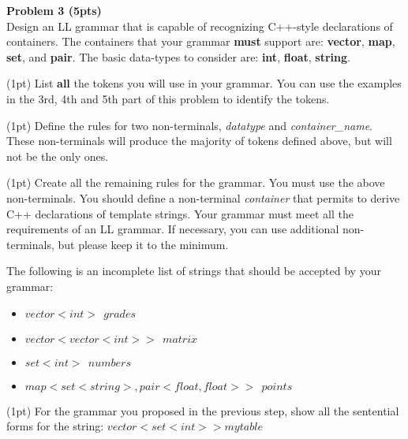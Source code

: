 
\noindent
{\bf Problem 3 (5pts)}\\

Design an LL grammar that is capable of recognizing C++-style declarations of containers. The containers that your grammar
{\bf must} support are: {\bf vector}, {\bf map}, {\bf set}, and  {\bf pair}. The basic data-types to consider are: {\bf int}, {\bf float}, {\bf string}.

\noindent
(1pt) List {\bf all} the tokens you will use in your grammar. You can use the examples in the 3rd, 4th and 5th part of this problem to identify the tokens.

\vspace{2.5in}

\noindent
(1pt) Define the rules for two non-terminals, {\em datatype} and {\em container\_name}. These non-terminals will produce the majority of
tokens defined above, but will not be the only ones.


\vspace{2.5in}

\noindent
(1pt) Create all the remaining rules for the grammar. You must use the above non-terminals. 
You should define a non-terminal {\em container} that permits to derive C++ declarations of template strings.
Your grammar must meet all the requirements of an LL grammar. If necessary, you can use additional non-terminals, but please keep it to the minimum.

The following is an incomplete list of strings that should be accepted by your grammar:
\begin{itemize}
\item $vector<int>~~ grades $
\item $vector<vector<int>>~~ matrix$
\item $set<int>~~ numbers$
\item $map<set<string>,pair<float,float>>~~ points$
\end{itemize}



\vspace{3in}

\noindent
(1pt) For the grammar you proposed in the previous step, show all the sentential forms for the string: $vector<set<int> > mytable$



\vspace{3in}

\noindent

